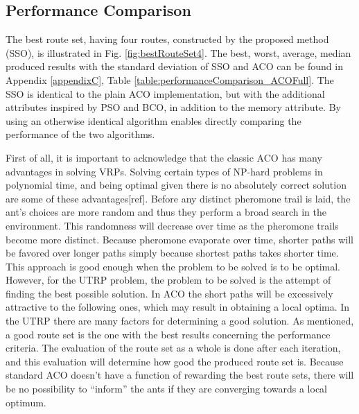 \subsection{Performance Comparison}
\label{subsec:performanceComparisonDiscussion}


The best route set, having four routes, constructed by the proposed method (SSO), is illustrated in Fig. \vref{fig:bestRouteSet4}. The best, worst, average, median produced results with the standard deviation of SSO and ACO can be found in Appendix \ref{appendixC}, Table \vref{table:performanceComparison_ACOFull}. The SSO is identical to the plain ACO implementation, but with the additional attributes inspired by PSO and BCO, in addition to the memory attribute. By using an otherwise identical algorithm enables directly comparing the performance of the two algorithms. 

First of all, it is important to acknowledge that the classic ACO has many advantages in solving VRPs. Solving certain types of NP-hard problems in polynomial time, and being optimal given there is no absolutely correct solution are some of these advantages[ref]. Before any distinct pheromone trail is laid, the ant's choices are more random and thus they perform a broad search in the environment. This randomness will decrease over time as the pheromone trails become more distinct. Because pheromone evaporate over time, shorter paths will be favored over longer paths simply because shortest paths takes shorter time. This approach is good enough when the problem to be solved is to be optimal. However, for the UTRP problem, the problem to be solved is the attempt of finding the best possible solution. In ACO the short paths will be excessively attractive to the following ones, which may result in obtaining a local optima. In the UTRP there are many factors for determining a good solution. As mentioned, a good route set is the one with the best results concerning the performance criteria. The evaluation of the route set as a whole is done after each iteration, and this evaluation will determine how good the produced route set is. Because standard ACO doesn't have a function of rewarding the best route sets, there will be no possibility to ``inform'' the ants if they are converging towards a local optimum. %

